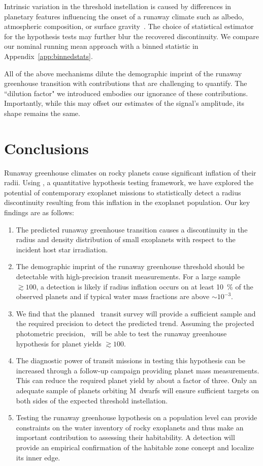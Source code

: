 \documentclass[twocolumn]{aastex631}
\begin{document}
Intrinsic variation in the threshold instellation is caused by differences in planetary features influencing the onset of a runaway climate such as albedo, atmospheric composition, or surface gravity~\citep{Pierrehumbert2022}.
The choice of statistical estimator for the hypothesis tests may further blur the recovered discontinuity.
We compare our nominal running mean approach with a binned statistic in Appendix~\ref{app:binnedstats}.

All of the above mechanisms dilute the demographic imprint of the runaway greenhouse transition with contributions that are challenging to quantify.
The ``dilution factor" we introduced embodies our ignorance of these contributions.
Importantly, while this may offset our estimates of the signal's amplitude, its shape remains the same.



\section{Conclusions}
Runaway greenhouse climates on rocky planets cause significant inflation of their radii.
Using \bioverse, a quantitative hypothesis testing framework, we have explored the potential of contemporary exoplanet missions to statistically detect a radius discontinuity resulting from this inflation in the exoplanet population.
Our key findings are as follows:
\begin{enumerate}
    \item The predicted runaway greenhouse transition causes a discontinuity in the radius and density distribution of small exoplanets with respect to the incident host star irradiation.
    \item The demographic imprint of the runaway greenhouse threshold should be detectable with high-precision transit measurements. For a large sample $\gtrsim 100$, a detection is likely if radius inflation occurs on at least \SI{10}{\percent} of the observed planets and if typical water mass fractions are above $\sim 10^{-3}$.
    \item We find that the planned \plato\ transit survey will provide a sufficient sample and the required precision to detect the predicted trend. Assuming the projected photometric precision, \plato\ will be able to test the runaway greenhouse hypothesis for planet yields $\gtrsim 100$.
    \item The diagnostic power of transit missions in testing this hypothesis can be increased through a follow-up campaign providing planet mass measurements.
          This can reduce the required planet yield by about a factor of three.
          Only an adequate sample of planets orbiting M~dwarfs will ensure sufficient targets on both sides of the expected threshold instellation.
    \item Testing the runaway greenhouse hypothesis on a population level can provide constraints on the water inventory of rocky exoplanets and thus make an important contribution to assessing their habitability.
         A detection will provide an empirical confirmation of the habitable zone concept and localize its inner edge.

\end{enumerate}
\end{document}
